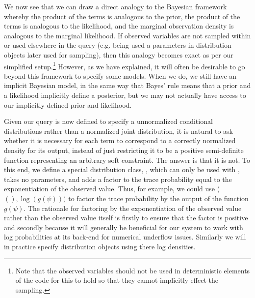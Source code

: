 We now see that we can draw a direct analogy to the Bayesian framework whereby the product of the
\sample terms is analogous to the prior, the product of the \observe terms is analogous to the
likelihood, and the marginal observation density is analogous to the marginal likelihood.  If observed variables
are not sampled within or used elsewhere in the query (e.g. being used a parameters in distribution objects
later used for sampling), then this analogy becomes exact as per our simplified setup.\footnote{Note that the
	observed variables should not be used in deterministic elements of the code for this to hold so that they
	cannot implicitly effect the sampling.}  However, as we have explained, it will often be desirable to go
beyond this framework to specify some models.  When we do, we still have an implicit Bayesian model, in the
same way that Bayes' rule means that a prior and a likelihood implicitly define a posterior, but we may not
actually have access to our implicitly defined prior and likelihood.

Given our query is now defined to specify a unnormalized conditional distributions rather than a normalized
joint distribution, it is natural to ask whether it is necessary for each \observe term to correspond to
a correctly normalized density for its output, instead of just restricting it to be a positive semi-definite
function representing an arbitrary soft constraint.  The answer is that it is not.  To this end, we define a 
special distribution class, \boppfactor, which can only be used with \observe, takes no parameters, and 
adds a factor to the trace probability equal to the exponentiation of the observed value.  Thus, for example, we could use
\observe (\boppfactor$(),\log(g(\psi)))$ to factor the trace probability by the output of the function $g(\psi)$.
The rationale for factoring by the exponentiation of the observed value rather than the observed value itself
is firstly to ensure that the factor is positive and secondly because it will generally be beneficial for
our system to work with log probabilities at its back-end for numerical underflow issues.  Similarly
we will in practice specify distribution objects using there log densities.

